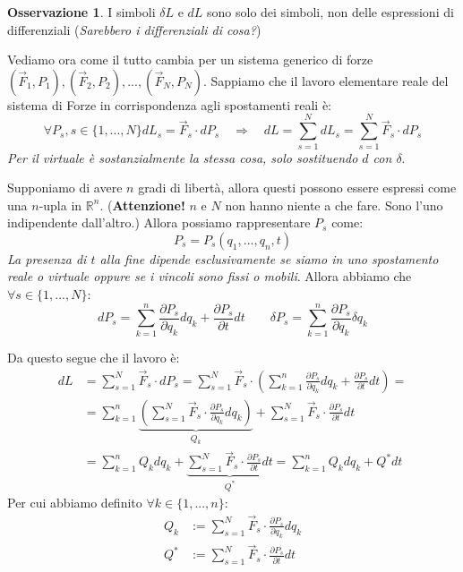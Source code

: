 \documentclass[11pt,a4paper,twoside]{article}
\theoremstyle{definition}
\newtheorem*{oss}{Osservazione}
\begin{document}
\begin{oss}
	I simboli $\delta L$ e $dL$ sono solo dei simboli, non delle espressioni di differenziali (\textit{Sarebbero i differenziali di cosa?})
\end{oss}

Vediamo ora come il tutto cambia per un sistema generico di forze $(\vec F_1, P_1), (\vec F_2, P_2),...,(\vec F_N, P_N)$. Sappiamo che il lavoro elementare reale del sistema di Forze in corrispondenza agli spostamenti reali è:
\[ \forall P_s, s \in \{1,...,N\} dL_s = \vec F_s \cdot dP_s\quad \Rightarrow\quad dL = \sum_{s =1}^N dL_s = \sum_{s = 1}^N \vec F_s \cdot dP_s \]
\textit{Per il virtuale è sostanzialmente la stessa cosa, solo sostituendo $d$ con $\delta$}.

Supponiamo di avere $n$ gradi di libertà, allora questi possono essere espressi come una $n$-upla in $\mathbb R^n$. (\textbf{Attenzione!} $n$ e $N$ non hanno niente a che fare. Sono l'uno indipendente dall'altro.) Allora possiamo rappresentare $P_s$ come:
\[ P_s = P_s(q_1,...,q_n, t) \]
\textit{La presenza di $t$ alla fine dipende esclusivamente se siamo in uno spostamento reale o virtuale oppure se i vincoli sono fissi o mobili}. Allora abbiamo che $\forall s \in \{1,...,N\}$:
\[ dP_s = \sum_{k= 1}^n \frac{\partial P_s}{\partial q_k}dq_k + \frac{\partial P_s}{\partial t}dt\qquad \delta P_s = \sum_{k = 1}^n \frac{\partial P_s}{\partial q_k}\delta q_k\]

Da questo segue che il lavoro è:
\begin{align*}
	dL &= \sum_{s = 1}^N \vec F_s \cdot dP_s = \sum_{s = 1}^N \vec F_s \cdot \left( \sum_{k = 1}^n \frac{\partial P_s}{\partial q_k}dq_k + \frac{\partial P_s}{\partial t}dt \right) =\\
	&= \sum_{k =1}^n \underbrace{\left(\sum_{s = 1}^N \vec F_s \cdot \frac{\partial P_s}{\partial q_k}dq_k \right)}_{Q_k} + \sum_{s = 1}^N \vec F_s \cdot \frac{\partial P_s}{\partial t}dt\\
	&= \sum_{k=1}^n Q_k dq_k + \underbrace{\sum_{s = 1}^N \vec F_s \cdot \frac{\partial P_s}{\partial t}dt}_{Q^*} = \sum_{k = 1}^n Q_k dq_k+Q^* dt
\end{align*}
Per cui abbiamo definito $\forall k \in\{1,...,n\}$:
\begin{align*}
	Q_k &:= \sum_{s = 1}^N \vec F_s \cdot \frac{\partial P_s}{\partial q_k}dq_k\\
	Q^* &:= \sum_{s = 1}^N \vec F_s \cdot \frac{\partial P_s}{\partial t}dt
\end{align*}
\end{document}
